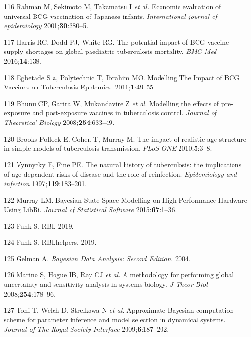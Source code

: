 \documentclass[11pt,twoside]{bristolthesis}
\begin{document}
  \leavevmode\hypertarget{ref-Rahman2001a}{}%
  116 Rahman M, Sekimoto M, Takamatsu I \emph{et al.} Economic evaluation of universal BCG vaccination of Japanese infants. \emph{International journal of epidemiology} 2001;\textbf{30}:380--5.
  
  \leavevmode\hypertarget{ref-Harris2016}{}%
  117 Harris RC, Dodd PJ, White RG. The potential impact of BCG vaccine supply shortages on global paediatric tuberculosis mortality. \emph{BMC Med} 2016;\textbf{14}:138.
  
  \leavevmode\hypertarget{ref-Egbetade2011a}{}%
  118 Egbetade S a, Polytechnic T, Ibrahim MO. Modelling The Impact of BCG Vaccines on Tuberculosis Epidemics. 2011;\textbf{1}:49--55.
  
  \leavevmode\hypertarget{ref-Bhunu2008b}{}%
  119 Bhunu CP, Garira W, Mukandavire Z \emph{et al.} Modelling the effects of pre-exposure and post-exposure vaccines in tuberculosis control. \emph{Journal of Theoretical Biology} 2008;\textbf{254}:633--49.
  
  \leavevmode\hypertarget{ref-Brooks-Pollock2010}{}%
  120 Brooks-Pollock E, Cohen T, Murray M. The impact of realistic age structure in simple models of tuberculosis transmission. \emph{PLoS ONE} 2010;\textbf{5}:3--8.
  
  \leavevmode\hypertarget{ref-Vynnycky1997a}{}%
  121 Vynnycky E, Fine PE. The natural history of tuberculosis: the implications of age-dependent risks of disease and the role of reinfection. \emph{Epidemiology and infection} 1997;\textbf{119}:183--201.
  
  \leavevmode\hypertarget{ref-Murray2015}{}%
  122 Murray LM. Bayesian State-Space Modelling on High-Performance Hardware Using LibBi. \emph{Journal of Statistical Software} 2015;\textbf{67}:1--36.
  
  \leavevmode\hypertarget{ref-Funk:2019ud}{}%
  123 Funk S. RBI. 2019.
  
  \leavevmode\hypertarget{ref-Funk:2019uw}{}%
  124 Funk S. RBI.helpers. 2019.
  
  \leavevmode\hypertarget{ref-Gelman:nll_LBlw}{}%
  125 Gelman A. \emph{Bayesian Data Analysis: Second Edition}. 2004.
  
  \leavevmode\hypertarget{ref-Marino2009a}{}%
  126 Marino S, Hogue IB, Ray CJ \emph{et al.} A methodology for performing global uncertainty and sensitivity analysis in systems biology. \emph{J Theor Biol} 2008;\textbf{254}:178--96.
  
  \leavevmode\hypertarget{ref-Toni2009}{}%
  127 Toni T, Welch D, Strelkowa N \emph{et al.} Approximate Bayesian computation scheme for parameter inference and model selection in dynamical systems. \emph{Journal of The Royal Society Interface} 2009;\textbf{6}:187--202.
  
\end{document}
